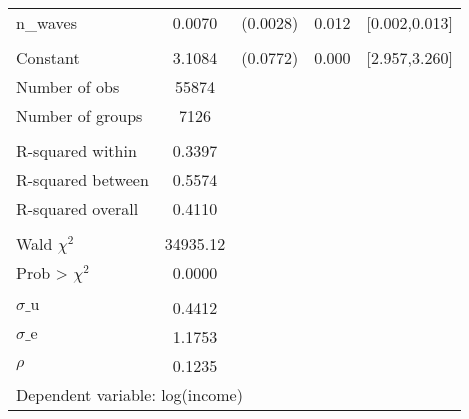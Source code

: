 {\begin{tabular}{l*{1}{cccc}}
n\_waves             &      0.0070&    (0.0028)&       0.012&[0.002,0.013]\\
                    &            &            &            &            \\
Constant            &      3.1084&    (0.0772)&       0.000&[2.957,3.260]\\
\midrule
Number of obs       &       55874&            &            &            \\
Number of groups    &        7126&            &            &            \\
\\ R-squared within &      0.3397&            &            &            \\
R-squared between   &      0.5574&            &            &            \\
R-squared overall   &      0.4110&            &            &            \\
\\ Wald $\chi^2$    &    34935.12&            &            &            \\
Prob > $\chi^2$     &      0.0000&            &            &            \\
\\ $\sigma\text{\_u}$&      0.4412&            &            &            \\
$\sigma\text{\_e}$   &      1.1753&            &            &            \\
$\rho$              &      0.1235&            &            &            \\
\bottomrule
\multicolumn{5}{l}{\footnotesize Dependent variable: log(income)}\\
\end{tabular}
}
